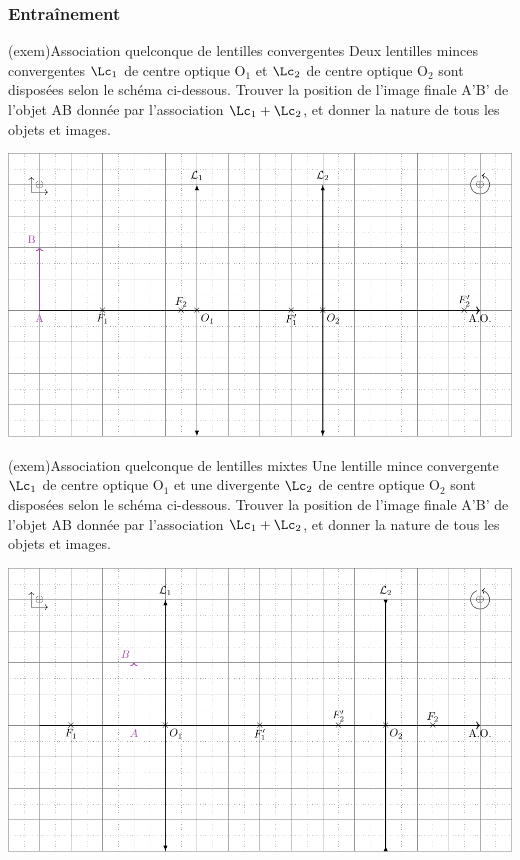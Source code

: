 \documentclass[../../main/main.tex]{subfiles}
\begin{document}
\subsubsection{Entraînement}

\begin{tcb}[label=exem:asso_lent](exem){Association quelconque de lentilles
			convergentes}
	Deux lentilles minces convergentes $\Lc_1$ de centre optique O$_1$ et
	$\Lc_2$ de centre optique O$_2$ sont disposées selon le schéma ci-dessous.
	Trouver la position de l'image finale A'B' de l'objet AB donnée par
	l'association $\Lc_1 + \Lc_2$, et donner la nature de tous les objets et
	images.
	\tcblower
	\begin{center}
		\includegraphics[width=.85\linewidth]{asso_lent-a_plain.pdf}
		\label{fig:asso_lent-conv_plain}
	\end{center}
\end{tcb}
\begin{tcb}[label=exem:asso_lent](exem){Association quelconque de lentilles
			mixtes}
	Une lentille mince convergente $\Lc_1$ de centre optique O$_1$ et une
	divergente $\Lc_2$ de centre optique O$_2$ sont disposées selon le schéma
	ci-dessous. Trouver la position de l'image finale A'B' de l'objet AB
	donnée par l'association $\Lc_1 + \Lc_2$, et donner la nature de tous les
	objets et images.
	\tcblower
	\begin{center}
		\includegraphics[width=.85\linewidth]{asso_lent-b_plain.pdf}
		\label{fig:asso_lent-mix_plain}
	\end{center}
\end{tcb}
\end{document}
